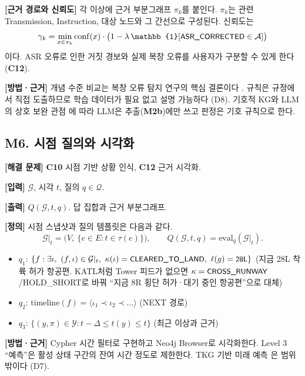 \documentclass[10pt,a4paper]{article}
\newcommand{\G}{\mathcal{G}}
\newcommand{\Yset}{\mathcal{Y}}
\newcommand{\cmd}[1]{\textsf{\small #1}}
\newcommand{\ch}[1]{\textbf{\textcolor{red!60!black}{#1}}}
\newcommand{\md}[1]{\textbf{\textcolor{blue!60!black}{#1}}}
\begin{document}
\textbf{[근거 경로와 신뢰도]} 각 이상에 근거 부분그래프 $\pi_k$를 붙인다. $\pi_k$는 관련 \cmd{Transmission}, \cmd{Instruction}, 대상 노드와 그 간선으로 구성된다. 신뢰도는
\begin{equation}
\gamma_k = \min_{x\in\pi_k}\mathrm{conf}(x)\cdot\big(1-\lambda\,\mathbb{1}[\cmd{ASR\_CORRECTED}\in\mathcal{A}]\big)
\end{equation}
이다. ASR 오류로 인한 거짓 경보와 실제 복창 오류를 사용자가 구분할 수 있게 한다 (\ch{C12}).

\textbf{[방법·근거]} 개념 수준 비교는 복창 오류 탐지 연구의 핵심 결론이다 \cite{helmke2021}. 규칙은 규정에서 직접 도출하므로 학습 데이터가 필요 없고 설명 가능하다 (D8). 기호적 KG와 LLM의 상호 보완 관점 \cite{pan2024}에 따라 LLM은 추출(\md{M2b})에만 쓰고 판정은 기호 규칙으로 한다.

\subsection{M6. 시점 질의와 시각화}
\textbf{[해결 문제]} \ch{C10} 시점 기반 상황 인식, \ch{C12} 근거 시각화.

\textbf{[입력]} $\G$, 시각 $t$, 질의 $q\in\mathcal{Q}$.

\textbf{[출력]} $Q(\G,t,q)$. 답 집합과 근거 부분그래프.

\textbf{[정의]} 시점 스냅샷과 질의 템플릿은 다음과 같다.
\begin{equation}
\G|_t = \big(V,\ \{e\in E : t\in\tau(e)\}\big),\qquad Q(\G,t,q) = \mathrm{eval}_q(\G|_t).
\end{equation}
\begin{itemize}
\item $q_1$: $\{f : \exists\iota,\ (f,\iota)\in\G|_t,\ \kappa(\iota)=\cmd{CLEARED\_TO\_LAND},\ \ell(g)=\cmd{28L}\}$ (지금 28L 착륙 허가 항공편. KATL처럼 Tower 피드가 없으면 $\kappa=\cmd{CROSS\_RUNWAY}$/\cmd{HOLD\_SHORT}로 바꿔 ``지금 8R 횡단 허가·대기 중인 항공편''으로 대체)
\item $q_2$: $\mathrm{timeline}(f) = \langle \iota_1 \prec \iota_2 \prec \dots\rangle$ (\cmd{NEXT} 경로)
\item $q_3$: $\{(y,\pi)\in\Yset : t-\Delta \le t(y) \le t\}$ (최근 이상과 근거)
\end{itemize}

\textbf{[방법·근거]} Cypher 시간 필터로 구현하고 Neo4j Browser로 시각화한다. Level 3 ``예측''은 활성 상태 구간의 잔여 시간 정도로 제한한다. TKG 기반 미래 예측 \cite{cai2024tkg}은 범위 밖이다 (D7).
\end{document}
